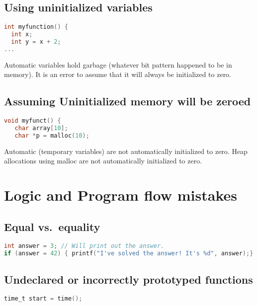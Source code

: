 \subsection{Using uninitialized
	variables}\label{using-uninitialized-variables}

\begin{lstlisting}[language=C]
int myfunction() {
  int x;
  int y = x + 2;
...
\end{lstlisting}

Automatic variables hold garbage (whatever bit pattern happened to be in
memory). It is an error to assume that it will always be initialized to
zero.

\subsection{Assuming Uninitialized memory will be zeroed}\label{assuming-uninitialized-memory-will-be-zeroed}

\begin{lstlisting}[language=C]
void myfunct() {
   char array[10];
   char *p = malloc(10);
\end{lstlisting}

Automatic (temporary variables) are not automatically initialized to zero. Heap allocations using malloc are not automatically initialized to zero.

\section{Logic and Program flow
  mistakes}\label{logic-and-program-flow-mistakes}

\subsection{Equal vs.~equality}\label{equal-vs.equality}

\begin{lstlisting}[language=C]
int answer = 3; // Will print out the answer.
if (answer = 42) { printf("I've solved the answer! It's %d", answer);}
\end{lstlisting}

\subsection{Undeclared or incorrectly prototyped
	functions}\label{undeclared-or-incorrectly-prototyped-functions}

\begin{lstlisting}[language=C]
time_t start = time();
\end{lstlisting}

